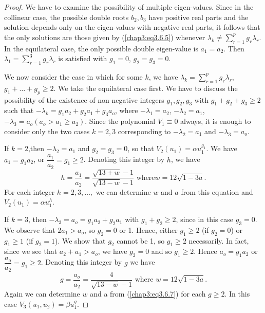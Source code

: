 \begin{proof}
We have to examine the possibility of multiple eigen-values. Since in
the collinear case, the possible double roots $b_2, b_3$ have positive
real parts and the solution depends only on the eigen-values with
negative real parts, it follows that the only solutions are those
given by (\ref{chap3:eq3.6.5}) whenever $\lambda_k \neq
\sum\limits^p_{r=1} g_r \lambda_r$. In the equilateral case, the only
possible double eigen-value is $a_1 = a_2$. Then $\lambda_1 =
\sum\limits^3_{r=1} g_r \lambda_r$ is satisfied with $g_1 = 0$, $g_2 =
g_3 = 0$. 

We now consider the case in which for some $k$, we have $\lambda_k =
\sum\limits^p_{r=1} g_r \lambda_r$, $g_1 + \ldots + g_p \geq 2$. We
take the equilateral case first. We have to discuss the possibility of
the existence of non-negative integers $g_1, g_2, g_3$ with $g_1 + g_2
+ g_3 \geq 2$ such that $-\lambda_k = g_1 a_2 + g_2 a_1 + g_3 a_o$,
where $-\lambda_1 = a_2$, $-\lambda_2 = a_1$, $-\lambda_3 = a_o(a_o >
a_1 \geq a_2)$. Since the polynomial $V_1 \equiv 0$ always, it is
enough to consider only the two cases $k=2,3$ corresponding to
$-\lambda_2 =a_1$ and $-\lambda_3=a_o$. 

If $k=2$,\pageoriginale then $-\lambda_2 = a_1$ and $g_2 = g_3 =0$, so
that $V_2(u_1) = \alpha u^{g_1}_1$. We have $a_1 = g_1 a_2$, or
$\dfrac{a_1}{a_2} = g_1 \geq 2$. Denoting this integer by $h$, we have  
\begin{equation*}
h = \frac{a_1}{a_2} = \frac{\sqrt{13+w}-1}{\sqrt{13-w}-1} \text{ where
} w = 12 \sqrt{1-3a}. \tag{3.6.6}\label{chap3:eq3.6.6} 
\end{equation*}
For each integer $h=2, 3, \ldots, $ we can determine $w$ and $a$ from
this equation and $V_2 (u_1) = \alpha u^h_1$. 

If $k =3$, then $-\lambda_3 = a_o = g_1 a_2 + g_2 a_1$ with $g_1 + g_2
\geq 2$, since in this case $g_3 = 0$. We observe that $2a_1 >a_o$, so
$g_2 =0$ or 1. Hence, either $g_1 \geq 2 $ (if $g_2 = 0$) or $g_1 \geq
1$ (if $g_2 =1$). We show that $g_2$ cannot be 1, so $g_1 \geq 2$
necessarily. In fact, since we see that $a_2 + a_1 >a_o$, we have $g_2
= 0$ and so $g_1 \geq 2$. Hence $a_o = g_1 a_2$ or $\dfrac{a_o}{a_2} =
g_1 \geq 2$. Denoting this integer by $g$ we have 
\begin{equation*}
g = \frac{a_o}{a_2} = \frac{4}{\sqrt{13-w}-1} \text{ where } w = 12
\sqrt{1-3a}.  
\tag{3.6.7}\label{chap3:eq3.6.7}
\end{equation*}
Again we can determine $w$ and a from (\ref{chap3:eq3.6.7}) for each
$g \geq 2$. In this case $V_3 (u_1, u_2) = \beta u^g_1$. 


\end{proof}

